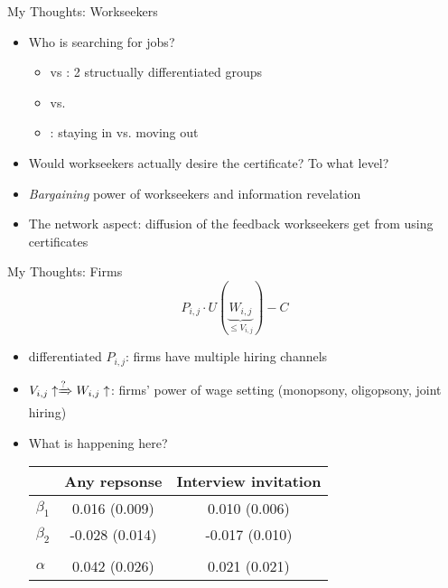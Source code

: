 \begin{frame}{My Thoughts: Workseekers}
    \begin{itemize}
        \item<+-> Who is searching for jobs?
        \begin{itemize}
            \item<+->[-]  vs : 2 structually differentiated groups
            \item<+->[-]  vs. 
            \item<+->[-] : staying in vs. moving out
        \end{itemize}
        \item<+-> Would workseekers actually desire the certificate? To what level?
        \item<+-> \textit{Bargaining} power of workseekers and information revelation
        \item<+-> The network aspect: diffusion of the feedback workseekers get from using certificates
    \end{itemize}
\end{frame}

\begin{frame}{My Thoughts: Firms}
    $$ P_{i,j}\cdot U(\underbrace{W_{i,j}}_{\leq V_{i,j}})-C $$
    \begin{itemize}
        \small
        \item<2-> differentiated $P_{i,j}$: firms have multiple hiring channels
        \item<3-> $V_{i,j}\uparrow \xRightarrow{?} W_{i,j}\uparrow$: firms' power of wage setting (monopsony, oligopsony, joint hiring)
        \item<4-> What is happening here?
        \begin{center}
            \scriptsize
            \begin{tabular}{lcc}
            & {Any repsonse} & {Interview invitation} \\ \hline
           $\beta_1$  & 0.016{ \tiny(0.009)} & 0.010{ \tiny(0.006)} \\
           $\beta_2$ & -0.028{ \tiny(0.014)} & -0.017{ \tiny(0.010)} \\
           & \\
           $\alpha$ & \textcolor{fuzzywuzzy!45!white}{0.042{ \tiny(0.026)}} & 0.021{ \tiny(0.021)}
            \end{tabular}
        \end{center}
    \end{itemize}
\end{frame}

